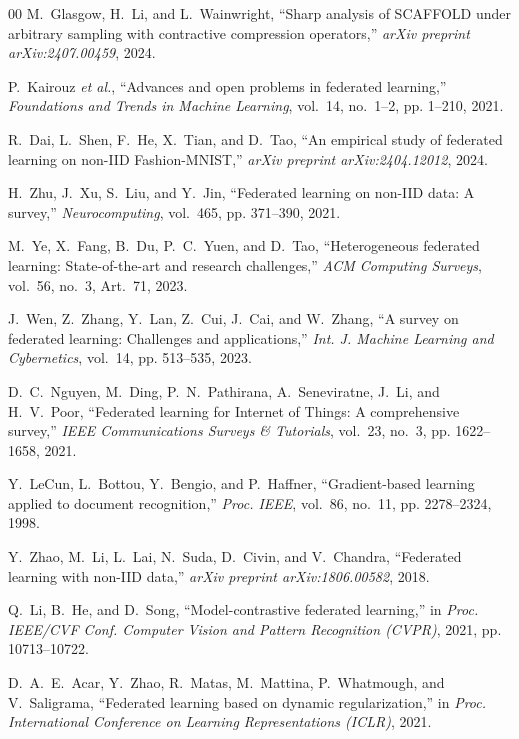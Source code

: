 \documentclass[conference]{IEEEtran}
\begin{document}
\begin{thebibliography}{00}
M.~Glasgow, H.~Li, and L.~Wainwright,
``Sharp analysis of SCAFFOLD under arbitrary sampling with contractive compression operators,''
\textit{arXiv preprint arXiv:2407.00459}, 2024.

P.~Kairouz \textit{et al.},
``Advances and open problems in federated learning,''
\textit{Foundations and Trends in Machine Learning}, vol.~14, no.~1--2, pp. 1--210, 2021.

R.~Dai, L.~Shen, F.~He, X.~Tian, and D.~Tao,
``An empirical study of federated learning on non-IID Fashion-MNIST,''
\textit{arXiv preprint arXiv:2404.12012}, 2024.

H.~Zhu, J.~Xu, S.~Liu, and Y.~Jin,
``Federated learning on non-IID data: A survey,''
\textit{Neurocomputing}, vol.~465, pp. 371--390, 2021.

M.~Ye, X.~Fang, B.~Du, P.~C.~Yuen, and D.~Tao,
``Heterogeneous federated learning: State-of-the-art and research challenges,''
\textit{ACM Computing Surveys}, vol.~56, no.~3, Art.~71, 2023.

J.~Wen, Z.~Zhang, Y.~Lan, Z.~Cui, J.~Cai, and W.~Zhang,
``A survey on federated learning: Challenges and applications,''
\textit{Int. J. Machine Learning and Cybernetics}, vol.~14, pp. 513--535, 2023.

D.~C.~Nguyen, M.~Ding, P.~N.~Pathirana, A.~Seneviratne, J.~Li, and H.~V.~Poor,
``Federated learning for Internet of Things: A comprehensive survey,''
\textit{IEEE Communications Surveys \& Tutorials}, vol.~23, no.~3, pp. 1622--1658, 2021.

Y.~LeCun, L.~Bottou, Y.~Bengio, and P.~Haffner,
``Gradient-based learning applied to document recognition,''
\textit{Proc. IEEE}, vol.~86, no.~11, pp. 2278--2324, 1998.

Y.~Zhao, M.~Li, L.~Lai, N.~Suda, D.~Civin, and V.~Chandra,
``Federated learning with non-IID data,''
\textit{arXiv preprint arXiv:1806.00582}, 2018.

Q.~Li, B.~He, and D.~Song,
``Model-contrastive federated learning,''
in \textit{Proc. IEEE/CVF Conf. Computer Vision and Pattern Recognition (CVPR)}, 2021, pp. 10713--10722.

D.~A.~E.~Acar, Y.~Zhao, R.~Matas, M.~Mattina, P.~Whatmough, and V.~Saligrama,
``Federated learning based on dynamic regularization,''
in \textit{Proc. International Conference on Learning Representations (ICLR)}, 2021.

\end{thebibliography}
\end{document}
